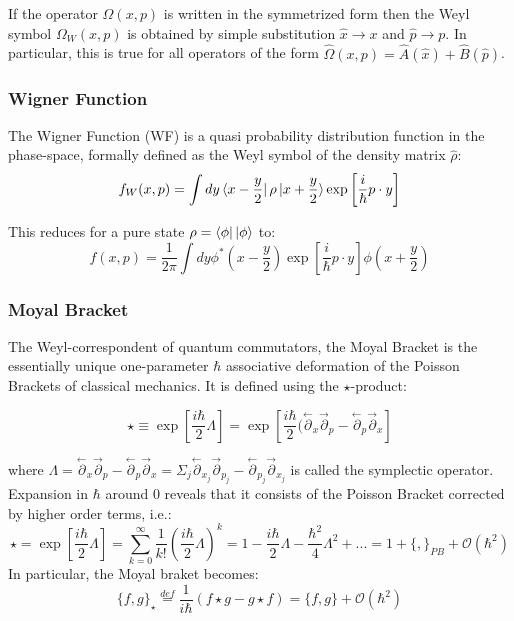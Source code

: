\documentclass[a4paper,10pt]{article}
\numberwithin{equation}{section}
\newcommand{\parl}{\overset{\leftarrow}{\partial}}
\newcommand{\parr}{\overset{\rightarrow}{\partial}}
\begin{document}
If the operator $\hat{\Omega}(x,p)$  is written in the symmetrized form then the Weyl symbol $\Omega_W(x,p)$ is obtained by simple substitution $\hat{x}\rightarrow x$ and $\hat{p}\rightarrow p$. In particular, this is true for all operators of the form $\hat{\Omega}(x,p) = \hat{A}(\hat{x}) + \hat{B}(\hat{p})$.

\subsubsection{Wigner Function}

The Wigner Function (WF) is a quasi probability distribution function in the phase-space, formally defined as the Weyl symbol of the density matrix $\hat{\rho}$:
\begin{equation}
    f_W(x,p) = \int dy\bra{x-\frac{y}{2}}\rho\ket{x+\frac{y}{2}}\exp\left[\frac{i}{\hbar}p \cdot y\right]
\end{equation}

This reduces for a pure state $\rho = \bra{\phi}\ket{\phi}$ to:
\begin{equation}
    f(x,p) = \frac{1}{2\pi}\int dy \phi^*\left(x-\frac{y}{2}\right) \exp\left[\frac{i}{\hbar}p \cdot y \right]\phi \left(x+\frac{y}{2}\right)
\end{equation}

\subsubsection{Moyal Bracket}

The Weyl-correspondent of quantum commutators, the Moyal Bracket is the essentially unique one-parameter $\hbar$ associative deformation of the Poisson Brackets of classical mechanics. It is defined using the $\star$-product:

\begin{equation}
    \star \equiv \exp \left[\frac{i\hbar}{2}\Lambda \right] = \exp \left[\frac{i\hbar}{2}(\parl_x\parr_p - \parl_p\parr_x \right]
\end{equation}

where $\Lambda = \parl_x \parr_p - \parl_p\parr_x = \Sigma_j \parl_{x_j}\parr_{p_j} - \parl_{p_j}\parr_{x_j} $ is called the symplectic operator.\\

Expansion in $\hbar$ around 0 reveals that it consists of the Poisson Bracket corrected by higher order terms, i.e.:
\begin{equation}
    \star = \exp \left[\frac{i\hbar}{2}\Lambda \right] = \sum_{k=0}^{\infty} \frac{1}{k!} \left(\frac{i\hbar}{2}\Lambda \right)^k = 1 - \frac{i\hbar}{2}\Lambda - \frac{\hbar^2}{4}\Lambda^2 + ... = 1+  \{,\}_{PB} + \mathcal{O}(\hbar^2)
\end{equation}
In particular, the Moyal braket becomes:
\begin{equation}
    \{f, g\}_\star \stackrel{def}{=}\frac{1}{i \hbar} \left( f \star g - g \star f \right) = \{f,g\}  + \mathcal{O}(\hbar^2)
\end{equation}
\end{document}
